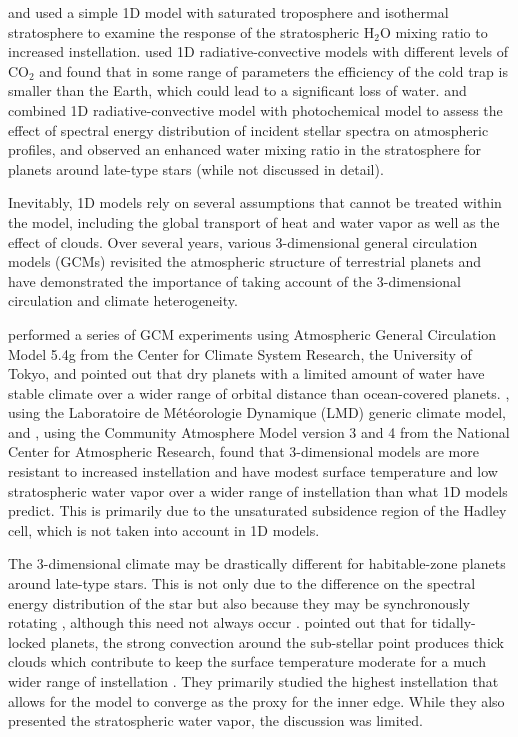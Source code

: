 \documentclass[11pt,numberedappendix,twocolappendix,]{emulateapj}
\def\water{H$_2$O }
\begin{document}
\citet{Kasting1993} and \citet{Kopparapu2013} used a simple 1D model with saturated troposphere and isothermal stratosphere to examine the response of the stratospheric \water mixing ratio to increased instellation. 
% 
\citet{Wordsworth2013} used 1D radiative-convective models with different levels of CO$_2$ and found that in some range of parameters the efficiency of the cold trap is smaller than the Earth, which could lead to a significant loss of water. 
%
\citet{Rugheimer2013} and \citet{Rugheimer2015} combined 1D radiative-convective model with photochemical model to assess the effect of spectral energy distribution of incident stellar spectra on atmospheric profiles, and observed an enhanced water mixing ratio in the stratosphere for planets around late-type stars (while not discussed in detail). 

Inevitably, 1D models rely on several assumptions that cannot be treated within the model, including the global transport of heat and water vapor as well as the effect of clouds. 
Over several years, various 3-dimensional general circulation models (GCMs) revisited the atmospheric structure of terrestrial planets and have demonstrated the importance of taking account of the 3-dimensional circulation and climate heterogeneity. 

 \citet{Abe2011} performed a series of GCM experiments using Atmospheric General Circulation Model 5.4g from the Center for Climate System Research, the University of Tokyo, and pointed out that dry planets with a limited amount of water have stable climate over a wider range of orbital distance than ocean-covered planets. 
\citet{Leconte2013b}, using the Laboratoire de M\'et\'eorologie Dynamique (LMD) generic climate model, and 
\citet{Wolf2014, Wolf2015}, using the Community Atmosphere Model version 3 and 4 from the National Center for Atmospheric Research, found that 3-dimensional models are more resistant to increased instellation and have modest surface temperature and low stratospheric water vapor over a wider range of instellation than what 1D models predict. This is primarily due to the unsaturated subsidence region of the Hadley cell, which is not taken into account in 1D models. 

The 3-dimensional climate may be drastically different for habitable-zone planets around late-type stars. 
This is not only due to the difference on the spectral energy distribution of the star but also because they may be synchronously rotating \citep{Dole1964, Kasting1993}, although this need not always occur \citep{Goldreich1966,Leconte2015}.  
%
\citet{Yang2013} pointed out that for tidally-locked planets, the strong convection around the sub-stellar point produces thick clouds which contribute to keep the surface temperature moderate for a much wider range of instellation \citep[see also][]{Yang2014,Way2015,Kopparapu2016}. 
They primarily studied the highest instellation that allows for the model to converge as the proxy for the inner edge. 
While they also presented the stratospheric water vapor, the discussion was limited. 
\end{document}
